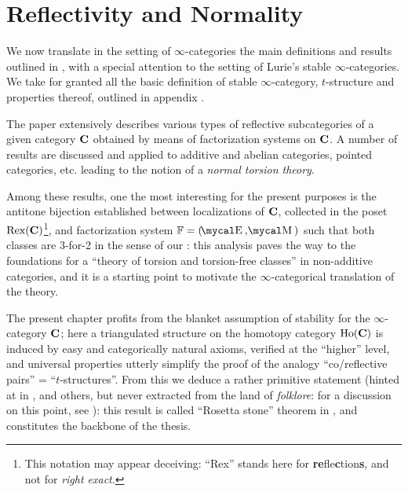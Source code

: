 \chapter{Reflectivity and Normality}\label{chap:refnorm}
\thispagestyle{empty}
We now translate in the setting of $\infty$\hyp{}categories the main definitions and results outlined in \cite{CHK}, with a special attention to the setting of Lurie's stable $\infty$\hyp{}categories. We take for granted all the basic definition of stable $\infty$\hyp{}category, $t$\hyp{}structure and properties thereof, outlined in appendix .

The paper \cite{CHK} extensively describes various types of reflective subcategories  of a given category $\textbf{C}$ obtained by means of factorization systems on $\textbf{C}$. A number of results are discussed and applied to additive and abelian categories, pointed categories, etc. leading to the notion of a \emph{normal torsion theory}.

Among these results, one the most interesting for the present purposes is the antitone bijection established between localizations of $\textbf{C}$, collected in the poset $\text{Rex}(\textbf{C})$\footnote{This notation may appear deceiving: ``Rex'' stands here for \textbf{re}fle\textbf{c}tion\textbf{s}, and not for \emph{right exact}.}, and factorization system $\fF=(\EE,\MM)$ such that both classes are 3\hyp{}for\hyp{}2 in the sense of our : this analysis paves the way to the foundations for a ``theory of torsion and torsion\hyp{}free classes'' in non\hyp{}additive categories, and it is a starting point to motivate the $\infty$\hyp{}categorical translation of the theory.

The present chapter profits from the blanket assumption of stability for the $\infty$\hyp{}category $\textbf{C}$; here a triangulated structure on the homotopy category $\text{Ho}(\textbf{C})$ is induced by easy and categorically natural axioms, verified at the ``higher'' level, and universal properties utterly simplify the proof of the analogy ``co\fshyp{}reflective pairs'' = ``$t$\hyp{}structures''. From this we deduce a rather primitive statement (hinted at in \cite{tilting,Beligiannisreiten}, and others, but never extracted from the land of \emph{folklore}: for a discussion on this point, see ): this result is called ``Rosetta stone'' theorem in , and constitutes the backbone of the thesis.

